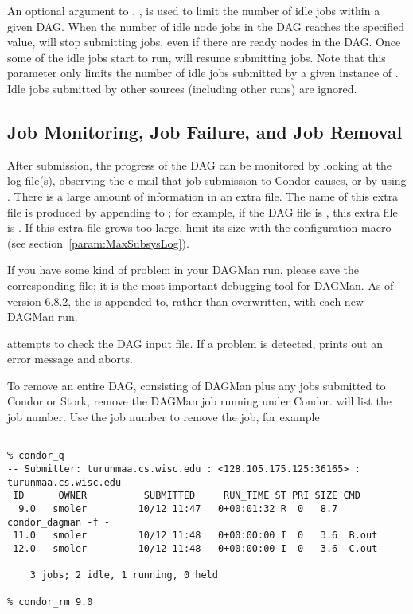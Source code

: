 An optional argument to , , 
is used to limit the number of idle jobs within a given DAG.
When the number of idle node jobs in the DAG reaches the specified
value,  will stop submitting jobs, even if there
are ready nodes in the DAG.  Once some of the idle jobs start to
run,  will resume submitting jobs.  Note that this
parameter only limits the number of idle jobs submitted by a
given instance of . Idle jobs submitted by other sources
(including other  runs) are ignored.

\subsection{Job Monitoring, Job Failure, and Job Removal}

After submission, the progress of the DAG can be monitored
by looking at the log file(s),
observing the e-mail that job submission to Condor causes,
or by using  .
There is a large amount of information in an extra file.
The name of this extra file is produced by appending
 to ; for example, if the
DAG file is , this extra file is
.
If this extra file grows too large, limit its size
with the  configuration macro (see
section~\ref{param:MaxSubsysLog}).

If you have some kind of problem in your DAGMan run, please save
the corresponding  file; it is the most important
debugging tool for DAGMan.  As of version 6.8.2, the 
is appended to, rather than overwritten, with each new DAGMan run.


 attempts to check the DAG input file.
If a problem is detected,
 prints out an error message and aborts.

To remove an entire DAG, consisting of DAGMan plus
any jobs submitted to Condor or Stork,
remove the DAGMan job running under Condor.
 will list the job number.
Use the job number to remove the job, for example

\footnotesize
\begin{verbatim}

% condor_q
-- Submitter: turunmaa.cs.wisc.edu : <128.105.175.125:36165> : turunmaa.cs.wisc.edu
 ID      OWNER          SUBMITTED     RUN_TIME ST PRI SIZE CMD
  9.0   smoler         10/12 11:47   0+00:01:32 R  0   8.7  condor_dagman -f -
 11.0   smoler         10/12 11:48   0+00:00:00 I  0   3.6  B.out
 12.0   smoler         10/12 11:48   0+00:00:00 I  0   3.6  C.out

    3 jobs; 2 idle, 1 running, 0 held

% condor_rm 9.0
\end{verbatim}
\normalsize

